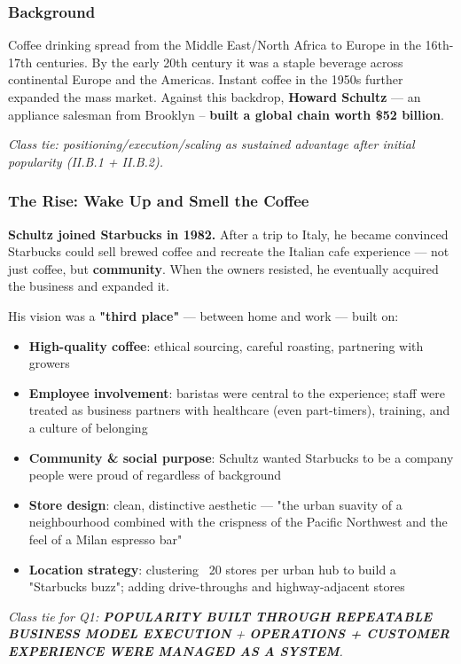 \documentclass[10pt,a4paper]{article}
\newcommand{\handnote}[1]{%
  \par\noindent\footnotesize\color{notepink}\textit{#1}\par%
  \vspace{0.25em}%
}
\newcommand{\hlpink}[1]{\colorbox{pink!25}{\textbf{#1}}}
\begin{document}
\subsubsection*{\color{eublue}Background}
Coffee drinking spread from the Middle East/North Africa to Europe in the 16th-17th centuries. By the early 20th century it was a staple beverage across continental Europe and the Americas. Instant coffee in the 1950s further expanded the mass market. Against this backdrop, \hlpink{Howard Schultz} --- an appliance salesman from Brooklyn -- \hlpink{built a global chain worth \$52 billion}.

\handnote{Class tie: positioning/execution/scaling as sustained advantage after initial popularity (II.B.1 + II.B.2).}

\subsubsection*{\color{eublue}The Rise: Wake Up and Smell the Coffee}
\hlpink{Schultz joined Starbucks in 1982.} After a trip to Italy, he became convinced Starbucks could sell brewed coffee and recreate the Italian cafe experience --- not just coffee, but \hlpink{community}. When the owners resisted, he eventually acquired the business and expanded it.

His vision was a \hlpink{"third place"} --- between home and work --- built on:
\begin{itemize}
  \item \hlpink{High-quality coffee}: ethical sourcing, careful roasting, partnering with growers
  \item \hlpink{Employee involvement}: baristas were central to the experience; staff were treated as business partners with healthcare (even part-timers), training, and a culture of belonging
  \item \hlpink{Community \& social purpose}: Schultz wanted Starbucks to be a company people were proud of regardless of background
  \item \hlpink{Store design}: clean, distinctive aesthetic --- "the urban suavity of a neighbourhood combined with the crispness of the Pacific Northwest and the feel of a Milan espresso bar"
  \item \hlpink{Location strategy}: clustering ~20 stores per urban hub to build a "Starbucks buzz"; adding drive-throughs and highway-adjacent stores
\end{itemize}

\handnote{Class tie for Q1: \hlpink{POPULARITY BUILT THROUGH REPEATABLE BUSINESS MODEL EXECUTION} + \hlpink{OPERATIONS + CUSTOMER EXPERIENCE WERE MANAGED AS A SYSTEM}.}
\end{document}
